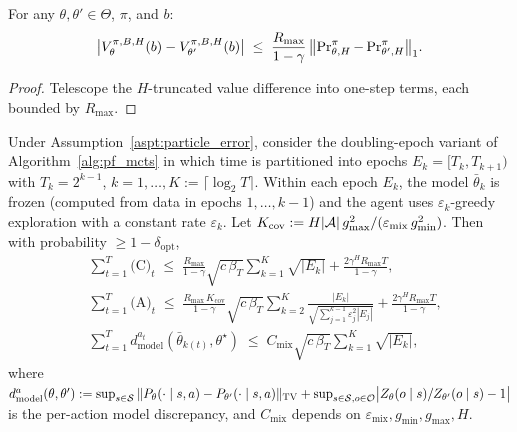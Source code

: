 
\begin{lem}\label{lem:simulation}
For any $\theta,\theta'\in\Theta$, $\pi$, and $b$:
\[
\bigl|V_\theta^{\pi,B,H}(b)-V_{\theta'}^{\pi,B,H}(b)\bigr| 
\;\le\;
\frac{R_{\max}}{1-\gamma}\,\bigl\|\operatorname{Pr}_{\theta,H}^\pi-\operatorname{Pr}_{\theta',H}^\pi\bigr\|_1.
\]
\end{lem}
\begin{proof}
Telescope the $H$-truncated value difference into one-step terms, each bounded by $R_{\max}$.
\end{proof}

\begin{prop}\label{prop:model_error_combined}
Under Assumption~\ref{aspt:particle_error}, consider the doubling-epoch variant of Algorithm~\ref{alg:pf_mcts} in which time is partitioned into epochs $E_k=[T_k,T_{k+1})$ with $T_k=2^{k-1}$, $k=1,\ldots,K:=\lceil\log_2 T\rceil$. Within each epoch $E_k$, the model $\bar\theta_k$ is frozen (computed from data in epochs $1,\ldots,k-1$) and the agent uses $\varepsilon_k$-greedy exploration with a constant rate $\varepsilon_k$. Let $K_{\mathrm{cov}}:=H|{\mathcal{A}}|\,g_{\max}^2/(\varepsilon_{\mathrm{mix}}\,g_{\min}^2)$. Then with probability $\ge 1-\delta_{\mathrm{opt}}$,
\begin{align}
&\sum_{t=1}^T\text{(C)}_t
\;\le\;
\frac{R_{\max}}{1-\gamma}\sqrt{c\,\beta_T}\sum_{k=1}^K\sqrt{|E_k|}+\frac{2\gamma^H R_{\max} T}{1-\gamma}, \label{eq:c_bound}\\
&\sum_{t=1}^T\text{(A)}_t
\;\le\;
\frac{R_{\max}\,K_{\mathrm{cov}}}{1-\gamma}\sqrt{c\,\beta_T}\sum_{k=2}^K\frac{|E_k|}{\sqrt{\sum_{j=1}^{k-1}\varepsilon_j^2|E_j|}}+\frac{2\gamma^H R_{\max} T}{1-\gamma}, \label{eq:a_bound}\\
&\sum_{t=1}^T d_{\mathrm{model}}^{a_t}(\bar\theta_{k(t)},\theta^\star)
\;\le\;
C_{\mathrm{mix}}\sqrt{c\,\beta_T}\sum_{k=1}^K\sqrt{|E_k|}, \label{eq:dmodel_bound}
\end{align}
where $d_{\mathrm{model}}^{a}(\theta,\theta'):=\sup_{s\in{\mathcal{S}}}\|P_\theta(\cdot\mid s,a)-P_{\theta'}(\cdot\mid s,a)\|_{\mathrm{TV}}+\sup_{s\in{\mathcal{S}},o\in{\mathcal{O}}}\bigl|Z_\theta(o\mid s)/Z_{\theta'}(o\mid s)-1\bigr|$ is the per-action model discrepancy, and $C_{\mathrm{mix}}$ depends on $\varepsilon_{\mathrm{mix}},g_{\min},g_{\max},H$.
\end{prop}



